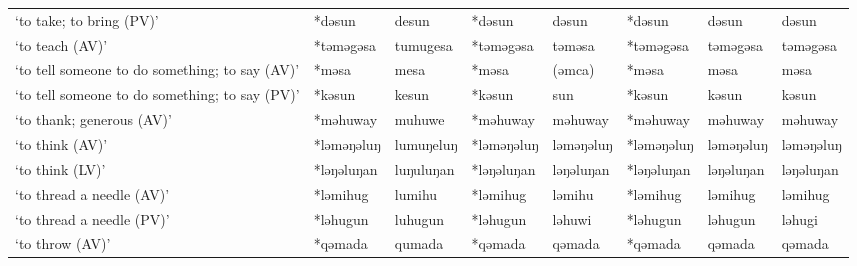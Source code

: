 \begin{landscape}
\begin{longtable}[c]{@{}p{3cm}<{\raggedright}p{2.75cm}<{\raggedright}p{2.75cm}<{\raggedright}p{2.75cm}<{\raggedright}p{2.75cm}<{\raggedright}p{2.75cm}<{\raggedright}p{2.75cm}<{\raggedright}p{2.75cm}<{\raggedright}@{}}
`to take; to bring (PV)'                             & *dəsun       & desun                         & *dəsun         & dəsun                      & *dəsun           & dəsun                    & dəsun                             \\
`to teach (AV)'                                      & *təməgəsa    & tumugesa                      & *təməgəsa      & təməsa                     & *təməgəsa        & təməgəsa                 & təməgəsa                          \\
`to tell someone to do something; to say (AV)'       & *məsa        & mesa                          & *məsa          & (əmca)                     & *məsa            & məsa                     & məsa                              \\
`to tell someone to do something; to say (PV)'       & *kəsun       & kesun                         & *kəsun         & sun                        & *kəsun           & kəsun                    & kəsun                             \\
`to thank; generous (AV)'                            & *məhuway     & muhuwe                        & *məhuway       & məhuway                    & *məhuway         & məhuway                  & məhuway                           \\
`to think (AV)'                                      & *ləməŋəluŋ   & lumuŋeluŋ                     & *ləməŋəluŋ     & ləməŋəluŋ                  & *ləməŋəluŋ       & ləməŋəluŋ                & ləməŋəluŋ                         \\
`to think (LV)'                                      & *ləŋəluŋan   & luŋuluŋan                     & *ləŋəluŋan     & ləŋəluŋan                  & *ləŋəluŋan       & ləŋəluŋan                & ləŋəluŋan                         \\
`to thread a needle (AV)'                            & *ləmihug     & lumihu                        & *ləmihug       & ləmihu                     & *ləmihug         & ləmihug                  & ləmihug                           \\
`to thread a needle (PV)'                            & *ləhugun     & luhugun                       & *ləhugun       & ləhuwi                     & *ləhugun         & ləhugun                  & ləhugi                            \\
`to throw (AV)'                                      & *qəmada      & qumada                        & *qəmada        & qəmada                     & *qəmada          & qəmada                   & qəmada                            \\

\end{longtable}
\end{landscape}
